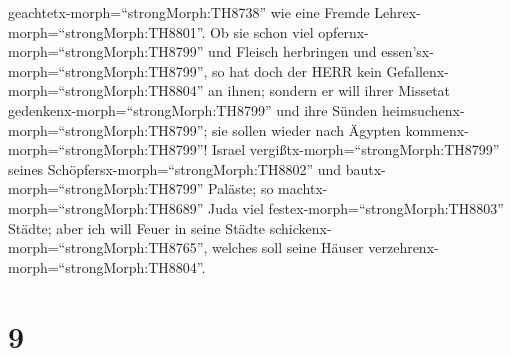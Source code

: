 geachtetx-morph=``strongMorph:TH8738'' wie eine Fremde
Lehrex-morph=``strongMorph:TH8801''.  Ob sie schon viel
opfernx-morph=``strongMorph:TH8799'' und Fleisch herbringen und
essen'sx-morph=``strongMorph:TH8799'', so hat doch der HERR kein
Gefallenx-morph=``strongMorph:TH8804'' an ihnen; sondern er will ihrer
Missetat gedenkenx-morph=``strongMorph:TH8799'' und ihre Sünden
heimsuchenx-morph=``strongMorph:TH8799''; sie sollen wieder nach Ägypten
kommenx-morph=``strongMorph:TH8799''!  Israel
vergißtx-morph=``strongMorph:TH8799'' seines
Schöpfersx-morph=``strongMorph:TH8802'' und
bautx-morph=``strongMorph:TH8799'' Paläste; so
machtx-morph=``strongMorph:TH8689'' Juda viel
festex-morph=``strongMorph:TH8803'' Städte; aber ich will Feuer in seine
Städte schickenx-morph=``strongMorph:TH8765'', welches soll seine Häuser
verzehrenx-morph=``strongMorph:TH8804''.

\hypertarget{section-8}{%
\section{9}\label{section-8}}

